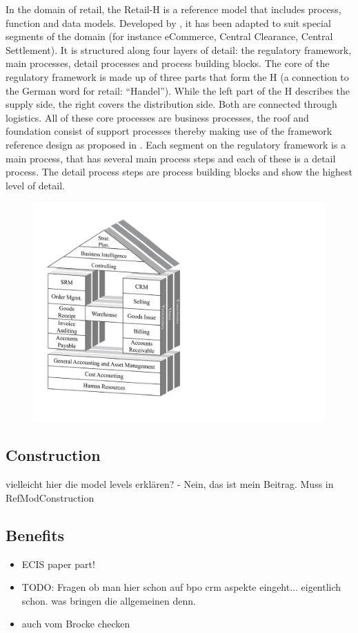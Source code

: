 		In the domain of retail, the Retail-H is a reference model that includes process, function and data models. Developed by \cite{Becker2004a}, it has been adapted to suit special segments of the domain (for instance eCommerce, Central Clearance, Central Settlement). 
		It is structured along four layers of detail: the regulatory framework, main processes, detail processes and process building blocks. The core of the regulatory framework is made up of three parts that form the H (a connection to the German word for retail: “Handel”). While the left part of the H describes the supply side, the right covers the distribution side. Both are connected through logistics. All of these core processes are business processes, the roof and foundation consist of support processes thereby making use of the framework reference design as proposed in \cite{Meise2001}. 
		Each segment on the regulatory framework is a main process, that has several main process steps and each of these is a detail process. The detail process steps are process building blocks and show the highest level of detail. 
		\begin{figure}[caption={Retail-H}, label={fig:retailh}]
			{	\includegraphics[width=.6\textwidth]{figures/retailh.pdf}}
		\end{figure}
		
	
	
	
		\subsection{Construction}
		vielleicht hier die model levels erklären? - Nein, das ist mein Beitrag. Muss in RefModConstruction 
		\subsection{Benefits}
		\begin{itemize}
			\item  ECIS paper part!
			\item TODO: Fragen ob man hier schon auf bpo crm aspekte eingeht... eigentlich schon. was bringen die allgemeinen denn. 
			\item auch vom Brocke checken 
		\end{itemize}
